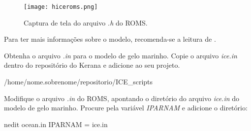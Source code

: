 \begin{figure}[H]
    \centering
    \texttt{[image: hiceroms.png]}
    \caption{Captura de tela do arquivo \textit{.h} do ROMS.}
    \label{hiceroms}
\end{figure}
\bigskip

\noindent Para ter mais informações sobre o modelo, recomenda-se a leitura de \textcite{hedstrom2018}.
\bigskip

\noindent Obtenha o arquivo \textit{.in} para o modelo de gelo marinho. Copie o arquivo \textit{ice.in} dentro do 
          repositório do Kerana e adicione ao seu projeto.
\bigskip

\begin{bashcode}
    /home/nome.sobrenome/repositorio/ICE_scripts
\end{bashcode}
\bigskip
    
\noindent Modifique o arquivo \textit{.in} do ROMS, apontando o diretório do arquivo \textit{ice.in} do 
          modelo de gelo marinho. Procure pela variável \textit{IPARNAM} e adicione o diretório:
\bigskip

\begin{bashcode}
nedit ocean.in
IPARNAM =  ice.in
\end{bashcode}

